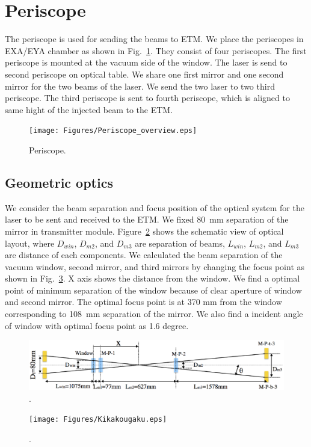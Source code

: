 \section{Periscope}
The periscope is used for sending the beams to ETM. We place the periscopes in EXA/EYA chamber as shown in Fig.~\ref{fig:Periscope_overview}.
They consist of four periscopes. The first periscope is mounted at the vacuum side of the window. The laser is send to second periscope on optical table. We share one first mirror and one second mirror for the two beams of the laser. We send the two laser to two third periscope. The third periscope is sent to fourth periscope, which is aligned to same hight of the injected beam to the ETM. 

\begin{figure}
\begin{center}
\texttt{[image: Figures/Periscope\_overview.eps]}
\caption{Periscope.} 
\label{fig:Periscope_overview} 
\end{center}
\end{figure}

\subsection{Geometric optics}
We consider the beam separation and focus position of the optical system for the laser to be sent and received to the ETM. We fixed 80~mm separation of the mirror in transmitter module.  Figure~\ref{fig:Kikakougaku_position} shows the schematic view of optical layout, where $D_{win}$, $D_{m2}$, and $D_{m3}$ are separation of beams, $L_{win}$, $L_{m2}$, and $L_{m3}$ are distance of each components.  We calculated the beam separation of the vacuum window, second mirror, and third mirrors by changing the focus point as shown in Fig.~\ref{fig:Kikakougaku}. X axis shows the distance from the window. We find a optimal point of minimum separation of the window because of clear aperture of window and second mirror. The optimal focus point is at 370 mm from the window corresponding to 108~mm separation of the mirror. We also find a incident angle of window with optimal focus point as 1.6 degree.




\begin{figure}
\begin{center}
\includegraphics[width=15cm]{Figures/Kikakougaku_position.eps}
\caption{.} 
\label{fig:Kikakougaku_position} 
\end{center}
\end{figure}
\begin{figure}
\begin{center}
\texttt{[image: Figures/Kikakougaku.eps]}
\caption{.} 
\label{fig:Kikakougaku} 
\end{center}
\end{figure}

